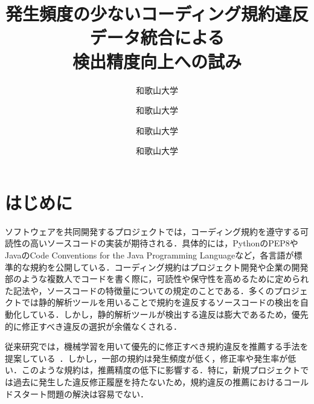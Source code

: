 \documentclass[uplatex,dvipdfmx,a4paper,twocolumn,base=11pt,jbase=11pt,ja=standard]{bxjsarticle}  %
\title{発生頻度の少ないコーディング規約違反データ統合による\\検出精度向上への試み}{Toward improving detection accuracy by integrating occasional coding convention violations datasets}
\author{和歌山大学}{亀岡　令}{Ryo Kameoka, Wakayama University}
\author{和歌山大学}{伊原　彰紀}{Akinori Ihara, Wakayama University}
\author{和歌山大学}{南　雄太}{Yuta Minami, Wakayama University}
\author{和歌山大学}{大森　楓己}{Fuki Omori, Wakayama University}
\begin{document}
\maketitle

\section{はじめに}
ソフトウェアを共同開発するプロジェクトでは，コーディング規約を遵守する可読性の高いソースコードの実装が期待される．具体的には，PythonのPEP8やJavaのCode Conventions for the Java Programming Languageなど，各言語が標準的な規約を公開している．コーディング規約はプロジェクト開発や企業の開発部のような複数人でコードを書く際に，可読性や保守性を高めるために定められた記法や，ソースコードの特徴量についての規定のことである．多くのプロジェクトでは静的解析ツールを用いることで規約を違反するソースコードの検出を自動化している．しかし，静的解析ツールが検出する違反は膨大であるため，優先的に修正すべき違反の選択が余儀なくされる．


従来研究では，機械学習を用いて優先的に修正すべき規約違反を推薦する手法を提案している~\cite{article1}．しかし，一部の規約は発生頻度が低く，修正率や発生率が低い．このような規約は，推薦精度の低下に影響する．特に，新規プロジェクトでは過去に発生した違反修正履歴を持たないため，規約違反の推薦におけるコールドスタート問題の解決は容易でない．


\end{document}
